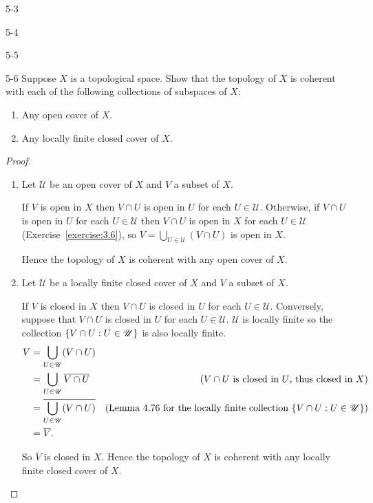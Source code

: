 \begin{problem}{5-3}\label{problem:5-3}
\end{problem}

\begin{problem}{5-4}\label{problem:5-4}
\end{problem}

\begin{problem}{5-5}\label{problem:5-5}
\end{problem}

\begin{problem}{5-6}\label{problem:5-6}
Suppose $X$ is a topological space. Show that the topology of $X$ is coherent with each of the following collections of subspaces of $X$:
\begin{enumerate}[label={(\alph*)}]
	\item Any open cover of $X$.
	\item Any locally finite closed cover of $X$.
\end{enumerate}
\end{problem}

\begin{proof}
	\begin{enumerate}[label={(\alph*)}]
		\item Let $\mathscr{U}$ be an open cover of $X$ and $V$ a subset of $X$.

		      If $V$ is open in $X$ then $V\cap U$ is open in $U$ for each $U\in\mathscr{U}$. Otherwise, if $V\cap U$ is open in $U$ for each $U\in\mathscr{U}$ then $V\cap U$ is open in $X$ for each $U\in\mathscr{U}$ (Exercise~\ref{exercise:3.6}), so $V = \bigcup_{U\in\mathscr{U}}(V\cap U)$ is open in $X$.

		      Hence the topology of $X$ is coherent with any open cover of $X$.
		\item Let $\mathscr{U}$ be a locally finite closed cover of $X$ and $V$ a subset of $X$.

		      If $V$ is closed in $X$ then $V\cap U$ is closed in $U$ for each $U\in\mathscr{U}$. Conversely, suppose that $V\cap U$ is closed in $U$ for each $U\in\mathscr{U}$. $\mathscr{U}$ is locally finite so the collection $\left\{{ V\cap U : U\in\mathscr{U} }\right\}$ is also locally finite.
		      \begin{align*}
			      V & = \bigcup_{U\in\mathscr{U}} (V\cap U)                                                                                                        \\
			        & = \bigcup_{U\in\mathscr{U}} \overline{V\cap U}   & \text{($V\cap U$ is closed in $U$, thus closed in $X$)}                                   \\
			        & = \overline{\bigcup_{U\in\mathscr{U}} (V\cap U)} & \text{(Lemma 4.76 for the locally finite collection $\left\{{ V\cap U : U\in\mathscr{U} }\right\}$)} \\
			        & = \overline{V}.
		      \end{align*}

		      So $V$ is closed in $X$. Hence the topology of $X$ is coherent with any locally finite closed cover of $X$.
	\end{enumerate}
\end{proof}

